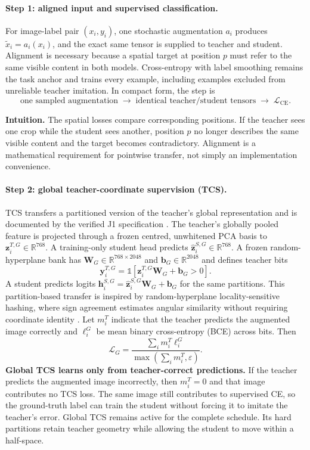 \paragraph{Step 1: aligned input and supervised classification.}
For image-label pair $(x_i,y_i)$, one stochastic augmentation $a_i$ produces
$\widetilde{x}_i=a_i(x_i)$, and the exact same tensor is supplied to teacher
and student. Alignment is necessary because a spatial target at position $p$
must refer to the same visible content in both models. Cross-entropy with label
smoothing remains the task anchor and trains every example, including examples
excluded from unreliable teacher imitation. In compact form, the step is
\[
\text{one sampled augmentation}
\;\longrightarrow\;
\text{identical teacher/student tensors}
\;\longrightarrow\;
\mathcal L_{\mathrm{CE}}.
\]

\textbf{Intuition.} The spatial losses compare corresponding positions. If the
teacher sees one crop while the student sees another, position $p$ no longer
describes the same visible content and the target becomes contradictory.
Alignment is a mathematical requirement for pointwise transfer, not simply an
implementation convenience.

\paragraph{Step 2: global teacher-coordinate supervision (TCS).}
TCS transfers a partitioned version of the teacher's global representation and
is documented by the verified J1 specification \cite{chan2026j1}.
The teacher's globally pooled feature is projected through a frozen centred,
unwhitened PCA basis to $\bm z_i^{T,G}\in\mathbb{R}^{768}$. A training-only
student head predicts $\widehat{\bm z}_i^{S,G}\in\mathbb{R}^{768}$. A frozen
random-hyperplane bank has $\bm W_G\in\mathbb{R}^{768\times2048}$ and
$\bm b_G\in\mathbb{R}^{2048}$ and defines teacher bits
\begin{equation}
    \bm y_i^{T,G}
    =\mathbb{1}[\bm z_i^{T,G}\bm W_G+\bm b_G>0].
\end{equation}
A student predicts logits
$\bm h_i^{S,G}=\widehat{\bm z}_i^{S,G}\bm W_G+\bm b_G$ for the same
partitions. This partition-based transfer is inspired by random-hyperplane
locality-sensitive hashing, where sign agreement estimates angular similarity
without requiring coordinate identity \cite{charikar2002simhash}. Let
$m_i^T$ indicate that the teacher predicts the augmented image correctly and
$\ell_i^G$ be mean binary cross-entropy (BCE) across bits. Then
\begin{equation}
    \mathcal{L}_G
    =\frac{\sum_i m_i^T\ell_i^G}
           {\max(\sum_i m_i^T,\varepsilon)}.
\label{eq:global-tcs}
\end{equation}
\textbf{Global TCS learns only from teacher-correct predictions.} If the
teacher predicts the augmented image incorrectly, then $m_i^T=0$ and that image
contributes no TCS loss. The same image still contributes to supervised CE, so
the ground-truth label can train the student without forcing it to imitate the
teacher's error. Global TCS remains active for the complete schedule. Its hard
partitions retain teacher geometry while allowing the student to move within a
half-space.

